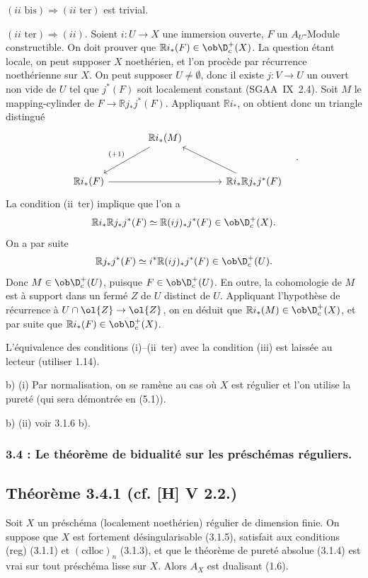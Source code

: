 $(ii\text{~bis}) \Rightarrow (ii\text{~ter})$ est trivial.

$(ii\text{~ter}) \Rightarrow (ii)$. Soient $i : U \to X$ une immersion ouverte, $F$ un $A_U$-Module constructible. On doit prouver que $\mathbb{R} i_{*}(F) \in \ob \D_c^{+}(X)$. La question étant locale, on peut supposer $X$ noethérien, et l'on procède par récurrence noethérienne sur $X$. On peut supposer $U \neq \emptyset$, donc il existe 
$j : V \to U$ un
ouvert non vide de $U$ tel que $j^{*}(F)$ soit localement constant (SGAA~IX~2.4). Soit $M$ le mapping-cylinder de $F \to \mathbb{R} j_{*}j^{*}(F)$. Appliquant $\mathbb{R} i_{*}$, on obtient donc un triangle distingué
\[
\begin{tikzcd}[column sep=large,row sep=large]
& \mathbb{R} i_{*}(M) \arrow[dl,"{(+1)}"'] & \\
\mathbb{R} i_{*}(F) \arrow[rr] & & \mathbb{R} i_{*}\mathbb{R} j_{*}j^{*}(F) \arrow[ul]
\end{tikzcd}\quad .
\]
La condition (ii~ter) implique que l'on a
\[
\mathbb{R} i_{*} \mathbb{R} j_{*} j^{*}(F) \simeq \mathbb{R}(ij)_{*} j^{*}(F) \in \ob \D_c^{+}(X).
\]
On a par suite
\[
\mathbb{R} j_{*}j^{*}(F) \simeq i^{*} \mathbb{R}(ij)_{*} j^{*}(F) \in \ob \D_c^{+}(U).
\]
Donc $M \in \ob \D_c^{+}(U)$, puisque $F \in \ob \D_c^{+}(U)$. En outre, la cohomologie de $M$ est à support dans un fermé $Z$ de $U$ distinct de $U$. Appliquant l'hypothèse de récurrence à $U \cap \ol{Z} \to \ol{Z}$, on en déduit que $\mathbb{R} i_{*}(M) \in \ob \D_c^{+}(X)$, et par suite que $\mathbb{R} i_{*}(F) \in \ob \D_c^{+}(X)$.

L'équivalence des conditions (i)--(ii~ter) avec la condition (iii) est laissée au lecteur (utiliser 1.14).

b) (i) Par normalisation, on se ramène au cas où $X$ est régulier et l'on utilise la pureté (qui sera démontrée en (5.1)).

b) (ii) voir 3.1.6 b).

\subsubsection*{3.4 : Le théorème de bidualité sur les préschémas réguliers.}

\subsection*{Théorème 3.4.1 (cf. [H] V 2.2.)}
Soit $X$ un préschéma (localement noethérien) régulier de dimension finie. On suppose que $X$ est fortement désingularisable (3.1.5), satisfait aux conditions (reg) (3.1.1) et $(\mathrm{cdloc})_n$ (3.1.3), et que le théorème de pureté absolue (3.1.4) est vrai sur tout préschéma lisse sur $X$. Alors $A_X$ est dualisant (1.6).

